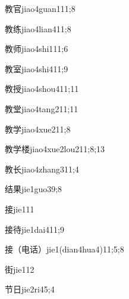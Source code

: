 \begin{verbete}{教官}{jiao4guan1}{11;8}
\end{verbete}
\begin{verbete}{教练}{jiao4lian4}{11;8}
\end{verbete}
\begin{verbete}{教师}{jiao4shi1}{11;6}
\end{verbete}
\begin{verbete}{教室}{jiao4shi4}{11;9}
\end{verbete}
\begin{verbete}{教授}{jiao4shou4}{11;11}
\end{verbete}
\begin{verbete}{教堂}{jiao4tang2}{11;11}
\end{verbete}
\begin{verbete}{教学}{jiao4xue2}{11;8}
\end{verbete}
\begin{verbete}{教学楼}{jiao4xue2lou2}{11;8;13}
\end{verbete}
\begin{verbete}{教长}{jiao4zhang3}{11;4}
\end{verbete}
\begin{verbete}{结果}{jie1guo3}{9;8}
\end{verbete}
\begin{verbete}{接}{jie1}{11}
\end{verbete}
\begin{verbete}{接待}{jie1dai4}{11;9}
\end{verbete}
\begin{verbete}{接（电话）}{jie1(dian4hua4)}{11;5;8}
\end{verbete}
\begin{verbete}{街}{jie1}{12}
\end{verbete}
\begin{verbete}{节日}{jie2ri4}{5;4}
\end{verbete}
